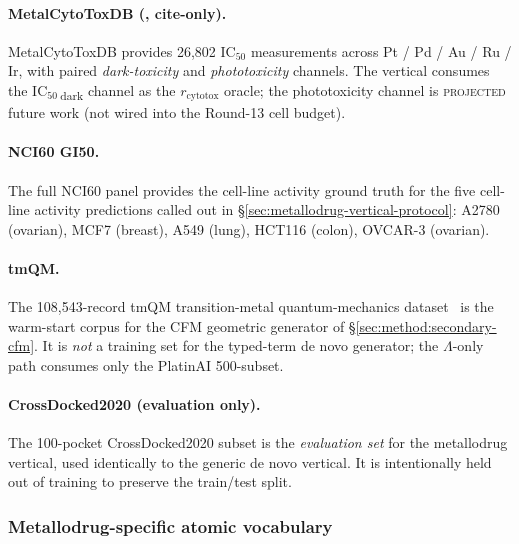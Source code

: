 \paragraph{MetalCytoToxDB (\cite{metalcytotoxdb}, cite-only).}
MetalCytoToxDB provides 26{,}802 IC$_{50}$ measurements
across Pt / Pd / Au / Ru / Ir, with paired
\emph{dark-toxicity} and \emph{phototoxicity} channels.
The vertical consumes the IC$_{50}$\,\textsubscript{dark}
channel as the $r_\text{cytotox}$ oracle; the phototoxicity
channel is \textsc{projected} future work (not wired into the
Round-13 cell budget).

\paragraph{NCI60 GI50.}
The full NCI60 panel provides the cell-line activity
ground truth for the five cell-line activity predictions
called out in \S\ref{sec:metallodrug-vertical-protocol}:
A2780 (ovarian), MCF7 (breast), A549 (lung),
HCT116 (colon), OVCAR-3 (ovarian).

\paragraph{tmQM.}
The 108{,}543-record tmQM transition-metal quantum-mechanics
dataset~\cite{baldini2017tmqm} is the warm-start corpus for
the CFM geometric generator of
\S\ref{sec:method:secondary-cfm}. It is \emph{not} a
training set for the typed-term de novo generator; the
$\Lambda$-only path consumes only the PlatinAI 500-subset.

\paragraph{CrossDocked2020 (evaluation only).}
The 100-pocket CrossDocked2020 subset is the \emph{evaluation
set} for the metallodrug vertical, used identically to the
generic de novo vertical. It is intentionally held out of
training to preserve the train/test split.

\subsubsection{Metallodrug-specific atomic vocabulary}
\label{sec:metallodrug-vertical-vocab}

